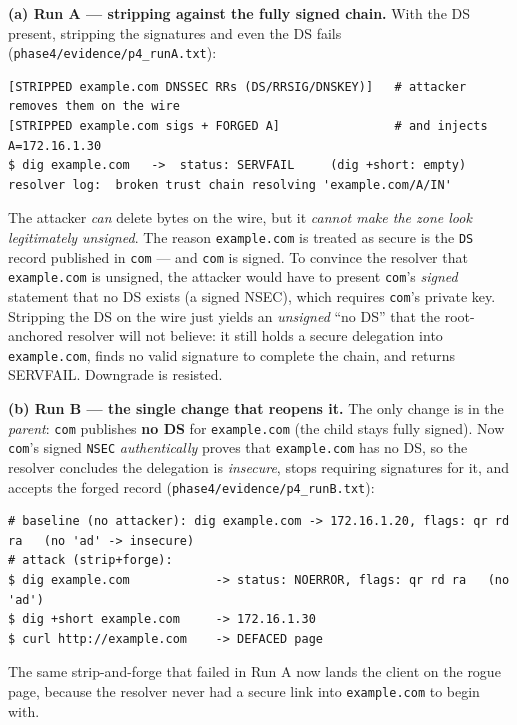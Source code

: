 \documentclass[11pt,a4paper]{article}
\begin{document}
\textbf{(a) Run A --- stripping against the fully signed chain.} With the DS present, stripping the
signatures and even the DS fails (\texttt{phase4/evidence/p4\_runA.txt}):
\begin{lstlisting}
[STRIPPED example.com DNSSEC RRs (DS/RRSIG/DNSKEY)]   # attacker removes them on the wire
[STRIPPED example.com sigs + FORGED A]                # and injects A=172.16.1.30
$ dig example.com   ->  status: SERVFAIL     (dig +short: empty)
resolver log:  broken trust chain resolving 'example.com/A/IN'
\end{lstlisting}
The attacker \emph{can} delete bytes on the wire, but it \emph{cannot make the zone look legitimately
unsigned}. The reason \texttt{example.com} is treated as secure is the \texttt{DS} record published
in \texttt{com} --- and \texttt{com} is signed. To convince the resolver that \texttt{example.com} is
unsigned, the attacker would have to present \texttt{com}'s \emph{signed} statement that no DS exists
(a signed NSEC), which requires \texttt{com}'s private key. Stripping the DS on the wire just yields
an \emph{unsigned} ``no DS'' that the root-anchored resolver will not believe: it still holds a secure
delegation into \texttt{example.com}, finds no valid signature to complete the chain, and returns
SERVFAIL. Downgrade is resisted.

\textbf{(b) Run B --- the single change that reopens it.} The only change is in the \emph{parent}:
\texttt{com} publishes \textbf{no DS} for \texttt{example.com} (the child stays fully signed). Now
\texttt{com}'s signed \texttt{NSEC} \emph{authentically} proves that \texttt{example.com} has no DS,
so the resolver concludes the delegation is \emph{insecure}, stops requiring signatures for it, and
accepts the forged record (\texttt{phase4/evidence/p4\_runB.txt}):
\begin{lstlisting}
# baseline (no attacker): dig example.com -> 172.16.1.20, flags: qr rd ra   (no 'ad' -> insecure)
# attack (strip+forge):
$ dig example.com            -> status: NOERROR, flags: qr rd ra   (no 'ad')
$ dig +short example.com     -> 172.16.1.30
$ curl http://example.com    -> DEFACED page
\end{lstlisting}
The same strip-and-forge that failed in Run A now lands the client on the rogue page, because the
resolver never had a secure link into \texttt{example.com} to begin with.
\end{document}
